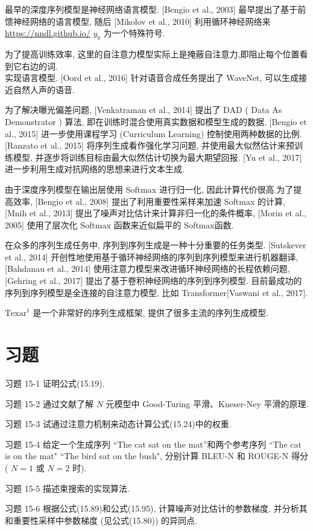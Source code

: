 \documentclass[10pt]{article}
\begin{document}
最早的深度序列模型是神经网络语言模型. [Bengio et al., 2003] 最早提出了基于前馈神经网络的语言模型, 随后 [Mikolov et al., 2010] 利用循环神经网络来 \href{https://nndl.github.io/}{https://nndl.github.io/} $y_{0}$ 为一个特殊符号.

为了提高训练效率, 这里的自注意力模型实际上是掩蔽自注意力,即阻止每个位置看到它右边的词.\\
实现语言模型. [Oord et al., 2016] 针对语音合成任务提出了 WaveNet, 可以生成接近自然人声的语音.

为了解决曝光偏差问题, [Venkatraman et al., 2014] 提出了 DAD ( Data As Demonstrator ) 算法, 即在训练时混合使用真实数据和模型生成的数据, [Bengio et al., 2015] 进一步使用课程学习 (Curriculum Learning) 控制使用两种数据的比例. [Ranzato et al., 2015] 将序列生成看作强化学习问题, 并使用最大似然估计来预训练模型, 并逐步将训练目标由最大似然估计切换为最大期望回报. [Yu et al., 2017] 进一步利用生成对抗网络的思想来进行文本生成.

由于深度序列模型在输出层使用 Softmax 进行归一化, 因此计算代价很高.为了提高效率, [Bengio et al., 2008] 提出了利用重要性采样来加速 Softmax 的计算, [Mnih et al., 2013] 提出了噪声对比估计来计算非归一化的条件概率, [Morin et al., 2005] 使用了层次化 Softmax 函数来近似扁平的 Softmax函数.

在众多的序列生成任务中, 序列到序列生成是一种十分重要的任务类型. [Sutskever et al., 2014] 开创性地使用基于循环神经网络的序列到序列模型来进行机器翻译, [Bahdanau et al., 2014] 使用注意力模型来改进循环神经网络的长程依赖问题, [Gehring et al., 2017] 提出了基于卷积神经网络的序列到序列模型. 目前最成功的序列到序列模型是全连接的自注意力模型, 比如 Transformer[Vaswani et al., 2017].

$\mathrm{Texar}^{1}$ 是一个非常好的序列生成框架, 提供了很多主流的序列生成模型.

\section*{习题}
习题 15-1 证明公式(15.19).

习题 15-2 通过文献了解 $N$ 元模型中 Good-Turing 平滑、Kneser-Ney 平滑的原理.

习题 15-3 试通过注意力机制来动态计算公式(15.24)中的权重.

习题 15-4 给定一个生成序列 “The cat sat on the mat”和两个参考序列 “The cat is on the mat" “The bird sat on the bush", 分别计算 BLEU-N 和 ROUGE-N 得分 ( $N=1$ 或 $N=2$ 时).

习题 15-5 描述束搜索的实现算法.

习题 15-6 根据公式(15.89)和公式(15.95), 计算噪声对比估计的参数梯度, 并分析其和重要性采样中参数梯度 (见公式(15.80)) 的异同点.
\end{document}
